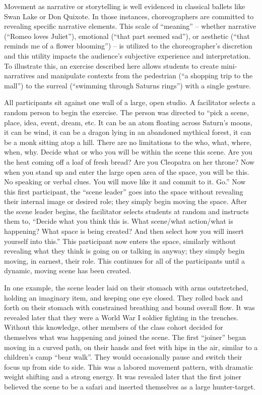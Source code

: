 \documentclass[arts,article,submit,moreauthors,pdftex,10pt,a4paper]{mdpi}
\begin{document}
 Movement as narrative or storytelling is well evidenced in classical ballets like Swan Lake or Don Quixote.  In those instances, choreographers are committed to revealing specific narrative elements.  This scale of ``meaning'' -- whether narrative (``Romeo loves Juliet''), emotional (``that part seemed sad''), or aesthetic (``that reminds me of a flower blooming'') -- is utilized to the choreographer’s discretion and this utility impacts the audience’s subjective experience and interpretation.  To illustrate this, an exercise described here allows students to create mini-narratives and manipulate contexts from the pedestrian (``a shopping trip to the mall'') to the surreal (``swimming through Saturns rings'') with a single gesture.  
 
 All participants sit against one wall of a large, open studio.  A facilitator selects a random person to begin the exercise.  The person was directed to ``pick a scene, place, idea, event, dream, etc.  It can
 be an atom floating across Saturn’s moons, it can be wind, it can be a dragon lying in an abandoned mythical forest, it can be a monk sitting atop a hill.  There are no limitations to the who, what, where, when, why.  Decide what or who you will be within the scene this scene.  Are you the heat coming off a loaf of fresh bread?  Are you Cleopatra on her throne?  Now when you stand up and enter the large open area of the space, you will be this.  No speaking or verbal clues.  You will move like it and commit to it.  Go.''
Now this first participant, the ``scene leader'' goes into the space without revealing their internal image or desired role; they simply begin moving the space.  After the scene leader begins, the facilitator selects students at random and instructs them to, ``Decide what you think this is.  What scene/what action/what is happening?  What space is being created?  And then select
 how you will insert yourself into this.''  This participant now enters the space, similarly without revealing what they think is going on or talking in anyway; they simply begin moving, in earnest, their role.  This continues for all of the participants until a dynamic, moving scene has been created.
 
In one example, the scene leader laid on their stomach with arms outstretched, holding an imaginary item, and keeping one eye closed.  They rolled back and forth on their stomach with constrained breathing and bound overall flow.  It was revealed later that they were a World War I soldier fighting in the trenches.  Without this knowledge, other members of the class cohort decided for themselves what was happening and joined the scene.  The first ``joiner'' began moving in a curved path, on their hands and feet with hips in the air, similar to a children’s camp ``bear walk''.  They would occasionally pause and switch their focus
 up from side to side.  This was a labored movement pattern, with dramatic weight shifting and a strong energy.  It was revealed later that the first joiner believed the scene to be a safari and inserted themselves as a large hunter-target.  
 
\end{document}
